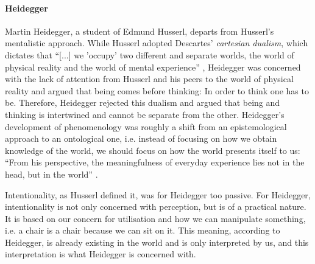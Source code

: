 \paragraph{Heidegger} Martin Heidegger, a student of Edmund Husserl, departs from Husserl's mentalistic approach. While Husserl adopted Descartes' \textit{cartesian dualism}, which dictates that ``[...] we 'occupy' two different and separate worlds, the world of physical reality and the world of mental experience'' \cite[p. 107]{dourish}, Heidegger was concerned with the lack of attention from Husserl and his peers to the world of physical reality and argued that being comes before thinking: In order to think one has to be. Therefore, Heidegger rejected this dualism and argued that being and thinking is intertwined and cannot be separate from the other. Heidegger's development of phenomenology was roughly a shift from an epistemological approach to an ontological one, i.e. instead of focusing on how we obtain knowledge of the world, we should focus on how the world presents itself to us: ``From his perspective, the meaningfulness of everyday experience lies not in the head, but in the world'' \cite[p. 107]{dourish}.

Intentionality, as Husserl defined it, was for Heidegger too passive. For Heidegger, intentionality is not only concerned with perception, but is of a practical nature. It is based on our concern for utilisation and how we can manipulate something, i.e. a chair is a chair because we can sit on it. This meaning, according to Heidegger, is already existing in the world and is only interpreted by us, and this interpretation is what Heidegger is concerned with.

